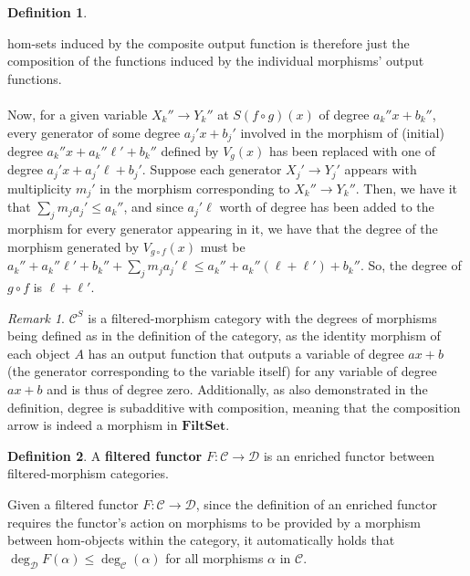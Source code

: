 \documentclass{article}
\theoremstyle{definition}
\newtheorem{definition}{Definition}[section]
\theoremstyle{remark}
\newtheorem*{remark}{Remark}
\begin{document}
\begin{definition}
\begin{itemize}
\begin{itemize}
        hom-sets induced by the composite output function is
        therefore just the composition of the functions induced by the
        individual morphisms' output functions.
        \\ \\
        Now, for a given
        variable $X_k''\to Y_k''$ at $S(f\circ g)(x)$ of degree
        $a_k''x+b_k''$,
        every generator of some degree
        $a_j'x+b_j'$
        involved in the morphism of
        (initial) degree $a_k''x+a_k''\ell'+b_k''$
        defined
        by $V_g(x)$ has been replaced with one of degree
        $a_j'x+a_j'\ell+b_j'$. Suppose each generator $X_j'\to Y_j'$
        appears with multiplicity $m_j'$ in the morphism corresponding to
        $X_k''\to Y_k''$. Then, we have it that $\sum_{j}m_ja_j' \leq 
        a_k''$, and since $a_j'\ell$ worth of degree has been added to
        the morphism for every generator appearing in it, we have that
        the degree of the morphism generated by $V_{g\circ f}(x)$ must
        be $a_k''+a_k''\ell'+b_k''+\sum_{j}m_ja_j'\ell \leq
        a_k''+a_k''(\ell+\ell')+b_k''$. So, the
        degree of $g\circ f$ is $\ell+\ell'$.
    \end{itemize}
\end{itemize}

\end{definition}

\begin{remark}
$\mathcal{C}^S$ is a filtered-morphism category with the degrees
of morphisms being defined as in the definition of
the category,
as the identity morphism of each object $A$ has an output function that
outputs a variable of degree $ax+b$ (the generator
corresponding to the variable itself) for any variable of degree
$ax+b$ and is thus of degree zero. Additionally, as also demonstrated
in the definition, degree is subadditive with composition, meaning
that the composition arrow is indeed a morphism in
$\mathbf{FiltSet}$.
\end{remark}

\begin{definition}
\label{def:filteredfunctor}
A \textbf{filtered functor} $F:\mathcal{C}\to \mathcal{D}$ is an
enriched functor
between filtered-morphism categories.
\end{definition}

Given a filtered functor $F:\mathcal{C} \to \mathcal{D}$, since
the definition of an enriched functor requires the functor's action
on morphisms 
to be provided by a morphism between hom-objects within the category,
it automatically holds that $\deg_{\mathcal{D}} F(\alpha)
\leq \deg_{\mathcal{C}}(\alpha)$ for all morphisms
$\alpha$ in
$\mathcal{C}$.
\end{document}
